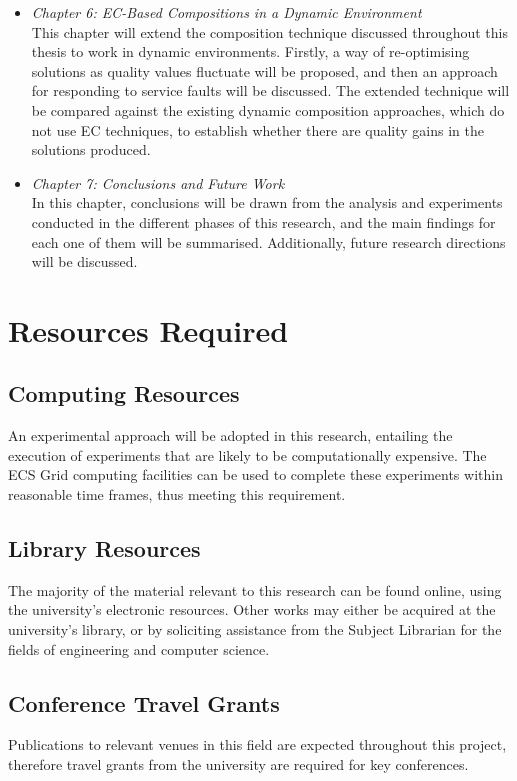 \begin{itemize}
 \item \textit{Chapter 6: EC-Based Compositions in a Dynamic Environment}\\
 This chapter will extend the composition technique discussed throughout this thesis to work in dynamic environments. Firstly, a way of re-optimising solutions as quality values fluctuate will be proposed, and then an approach for responding to service faults will be discussed. The extended technique will be compared against the existing dynamic composition approaches, which do not use EC techniques, to establish whether there are quality gains in the solutions produced.
 \item \textit{Chapter 7: Conclusions and Future Work}\\
 In this chapter, conclusions will be drawn from the analysis and experiments conducted in the different phases of this research, and the main findings for each one of them will be summarised. Additionally, future research directions will be discussed.
\end{itemize}


\section{Resources Required}

\subsection{Computing Resources}
An experimental approach will be adopted in this research, entailing the execution of experiments that are likely to be computationally expensive. The ECS Grid computing facilities can be used to complete these experiments within reasonable time frames, thus meeting this requirement.

\subsection{Library Resources}
The majority of the material relevant to this research can be found online, using the university's electronic resources. Other works may either be acquired at the university's library, or by soliciting assistance from the Subject Librarian for the fields of engineering and computer science.

\subsection{Conference Travel Grants}
Publications to relevant venues in this field are expected throughout this project, therefore travel grants from the university are required for key conferences.
